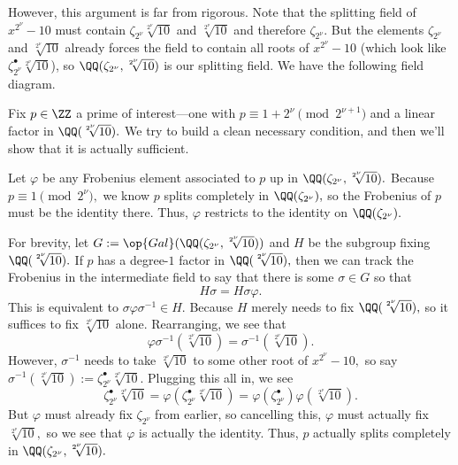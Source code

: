 However, this argument is far from rigorous. Note that the splitting field of $x^{2^\nu}-10$ must contain $\zeta_{2^\nu}\sqrt[2^\nu]{10}$ and $\sqrt[2^\nu]{10}$ and therefore $\zeta_{2^\nu}.$ But the elements $\zeta_{2^\nu}$ and $\sqrt[2^\nu]{10}$ already forces the field to contain all roots of $x^{2^\nu}-10$ (which look like $\zeta_{2^\nu}^\bullet\sqrt[2^\nu]{10}$), so $\QQ(\zeta_{2^\nu},\sqrt[2^\nu]{10})$ is our splitting field. We have the following field diagram.
\begin{center}
\end{center}
Fix $p\in\ZZ$ a prime of interest---one with $p\equiv1+2^\nu\pmod{2^{\nu+1}}$ and a linear factor in $\QQ(\sqrt[2^\nu]{10}).$ We try to build a clean necessary condition, and then we'll show that it is actually sufficient.

Let $\varphi$ be any Frobenius element associated to $p$ up in $\QQ(\zeta_{2^\nu},\sqrt[2^{\nu}]{10}).$ Because $p\equiv1\pmod{2^\nu},$ we know $p$ splits completely in $\QQ(\zeta_{2^\nu}),$ so the Frobenius of $p$ must be the identity there. Thus, $\varphi$ restricts to the identity on $\QQ(\zeta_{2^\nu}).$

For brevity, let $G:=\op{Gal}(\QQ(\zeta_{2^{\nu}},\sqrt[2^\nu]{10}))$ and $H$ be the subgroup fixing $\QQ(\sqrt[2^\nu]{10}).$ If $p$ has a degree-$1$ factor in $\QQ(\sqrt[2^\nu]{10}),$ then we can track the Frobenius in the intermediate field to say that there is some $\sigma\in G$ so that
\[H\sigma=H\sigma\varphi.\]
This is equivalent to $\sigma\varphi\sigma^{-1}\in H.$ Because $H$ merely needs to fix $\QQ(\sqrt[2^\nu]{10}),$ so it suffices to fix $\sqrt[2^\nu]{10}$ alone. Rearranging, we see that
\[\varphi\sigma^{-1}(\sqrt[2^\nu]{10})=\sigma^{-1}(\sqrt[2^\nu]{10}).\]
However, $\sigma^{-1}$ needs to take $\sqrt[2^\nu]{10}$ to some other root of $x^{2^\nu}-10,$ so say $\sigma^{-1}(\sqrt[2^\nu]{10}):=\zeta_{2^\nu}^\bullet\sqrt[2^\nu]{10}.$ Plugging this all in, we see
\[\zeta_{2^\nu}^\bullet\sqrt[2^\nu]{10}=\varphi\left(\zeta_{2^\nu}^\bullet\sqrt[2^\nu]{10}\right)=\varphi\left(\zeta_{2^\nu}^\bullet\right)\varphi\left(\sqrt[2^\nu]{10}\right).\]
But $\varphi$ must already fix $\zeta_{2^\nu}$ from earlier, so cancelling this, $\varphi$ must actually fix $\sqrt[2^\nu]{10},$ so we see that $\varphi$ is actually the identity. Thus, $p$ actually splits completely in $\QQ(\zeta_{2^\nu},\sqrt[2^\nu]{10}).$

